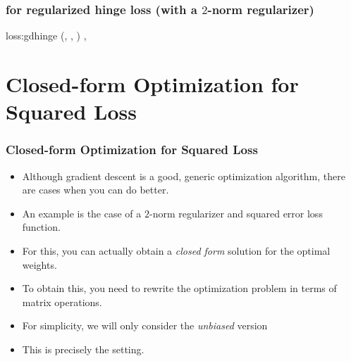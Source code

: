 \documentclass[trans,aspectratio=169]{beamer}
\begin{document}
\begin{frame}
  \frametitle{ for regularized hinge loss (with a
$2$-norm regularizer)}
\newalgorithm%
  {loss:gdhinge}%
  {(, \VAR{$\la$}, )}
  {
\ENDIF
\ENDFOR
\SETST{$\vg$}{$\VARm{\vg} + \VARm{\la} \VARm{\vw}$}
\SETST{$\vw$}{$\VARm{\vw} - \VARm{\eta} \VARm{\vg}$}
\ENDFOR
\RETURN \VAR{$\vw$}, 
}
\end{frame}
\section{Closed-form Optimization for Squared Loss}
\label{sec:loss:reg}

\begin{frame}
  \frametitle{Closed-form Optimization for Squared Loss}
\begin{itemize}
\item 
Although gradient descent is a good, generic optimization algorithm,
there are cases when you can do better. 
\item An example is the case of a
$2$-norm regularizer and squared error loss function.
\item  For this, you
can actually obtain a \emph{closed form} solution for the optimal
weights. 
\item To obtain this, you need to rewrite the
optimization problem in terms of matrix operations. 
\item  For simplicity,
we will only consider the \emph{unbiased} version
\item
This is precisely the 
setting.
\end{itemize}
\end{frame}
\end{document}
